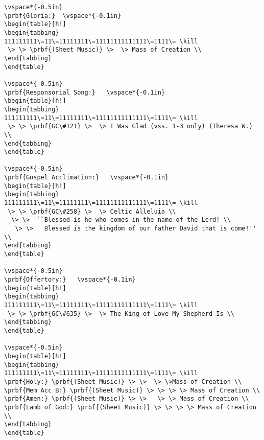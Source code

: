 {\begin{verbatim}
\vspace*{-0.5in}
\prbf{Gloria:}  \vspace*{-0.1in}
\begin{table}[h!]
\begin{tabbing}
111111111\=11\=11111111\=11111111111111\=1111\= \kill
 \> \> \prbf{(Sheet Music)} \>  \> Mass of Creation \\
\end{tabbing}
\end{table}

\vspace*{-0.5in}
\prbf{Responsorial Song:}   \vspace*{-0.1in}
\begin{table}[h!]
\begin{tabbing}
111111111\=11\=11111111\=11111111111111\=1111\= \kill
 \> \> \prbf{GC\#121} \>  \> I Was Glad (vss. 1-3 only) (Theresa W.) \\
\end{tabbing}
\end{table}

\vspace*{-0.5in}
\prbf{Gospel Acclimation:}   \vspace*{-0.1in}
\begin{table}[h!]
\begin{tabbing}
111111111\=11\=11111111\=11111111111111\=1111\= \kill
 \> \> \prbf{GC\#258} \>  \> Celtic Alleluia \\
  \> \>  ``Blessed is he who comes in the name of the Lord! \\
   \> \>   Blessed is the kingdom of our father David that is come!'' \\
\end{tabbing}
\end{table}

\vspace*{-0.5in}
\prbf{Offertory:}   \vspace*{-0.1in}
\begin{table}[h!]
\begin{tabbing}
111111111\=11\=11111111\=11111111111111\=1111\= \kill
 \> \> \prbf{GC\#635} \>  \> The King of Love My Shepherd Is \\
\end{tabbing}
\end{table}

\vspace*{-0.5in}
\begin{table}[h!]
\begin{tabbing}
111111111\=11\=11111111\=11111111111111\=1111\= \kill
\prbf{Holy:} \prbf{(Sheet Music)} \> \>  \> \>Mass of Creation \\
\prbf{Mem Acc B:} \prbf{(Sheet Music)} \> \> \> \> Mass of Creation \\
\prbf{Amen:} \prbf{(Sheet Music)} \> \>   \> \> Mass of Creation \\
\prbf{Lamb of God:} \prbf{(Sheet Music)} \> \> \> \> Mass of Creation \\
\end{tabbing}
\end{table}



\end{verbatim}}
